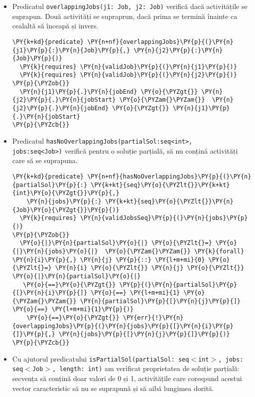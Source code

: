 \begin{itemize}
    \item 
    Predicatul \texttt{overlappingJobs(j1: Job, j2: Job)} verifică dacă activitățile se suprapun. Două activități se supraprun, dacă prima se termină înainte ca cealaltă să înceapă și invers. \begin{Verbatim}[commandchars=\\\{\}, fontsize=\footnotesize]
\PY{k+kd}{predicate} \PY{n+nf}{overlappingJobs}\PY{p}{(}\PY{n}{j1}\PY{p}{:}\PY{n}{Job}\PY{p}{,} \PY{n}{j2}\PY{p}{:}\PY{n}{Job}\PY{p}{)}
  \PY{k}{requires} \PY{n}{validJob}\PY{p}{(}\PY{n}{j1}\PY{p}{)}
  \PY{k}{requires} \PY{n}{validJob}\PY{p}{(}\PY{n}{j2}\PY{p}{)}
\PY{p}{\PYZob{}}
  \PY{n}{j1}\PY{p}{.}\PY{n}{jobEnd} \PY{o}{\PYZgt{}} \PY{n}{j2}\PY{p}{.}\PY{n}{jobStart} \PY{o}{\PYZam{}\PYZam{}}  \PY{n}{j2}\PY{p}{.}\PY{n}{jobEnd} \PY{o}{\PYZgt{}} \PY{n}{j1}\PY{p}{.}\PY{n}{jobStart} 
\PY{p}{\PYZcb{}}
\end{Verbatim}
    \item 
    Predicatul \texttt{hasNoOverlappingJobs(partialSol:seq<int>, \\jobs:seq<Job>)} verifică pentru o soluție parțială, să nu conțină activități care să se suprapuna.  
\begin{Verbatim}[commandchars=\\\{\}, fontsize=\footnotesize]
\PY{k+kd}{predicate} \PY{n+nf}{hasNoOverlappingJobs}\PY{p}{(}\PY{n}{partialSol}\PY{p}{:} \PY{k+kt}{seq}\PY{o}{\PYZlt{}}\PY{k+kt}{int}\PY{o}{\PYZgt{}}\PY{p}{,}
    \PY{n}{jobs}\PY{p}{:} \PY{k+kt}{seq}\PY{o}{\PYZlt{}}\PY{n}{Job}\PY{o}{\PYZgt{}}\PY{p}{)}
  \PY{k}{requires} \PY{n}{validJobsSeq}\PY{p}{(}\PY{n}{jobs}\PY{p}{)}
\PY{p}{\PYZob{}}
  \PY{o}{|}\PY{n}{partialSol}\PY{o}{|} \PY{o}{\PYZlt{}=} \PY{o}{|}\PY{n}{jobs}\PY{o}{|}  \PY{o}{\PYZam{}\PYZam{}} \PY{k}{forall} \PY{n}{i}\PY{p}{,} \PY{n}{j} \PY{p}{::} \PY{l+m+mi}{0} \PY{o}{\PYZlt{}=} \PY{n}{i} \PY{o}{\PYZlt{}} \PY{n}{j} \PY{o}{\PYZlt{}} \PY{o}{|}\PY{n}{partialSol}\PY{o}{|}
   \PY{o}{==}\PY{o}{\PYZgt{}} \PY{p}{(}\PY{n}{partialSol}\PY{p}{[}\PY{n}{i}\PY{p}{]} \PY{o}{==} \PY{l+m+mi}{1} \PY{o}{\PYZam{}\PYZam{}} \PY{n}{partialSol}\PY{p}{[}\PY{n}{j}\PY{p}{]} \PY{o}{==} \PY{l+m+mi}{1}\PY{p}{)}
    \PY{o}{==}\PY{o}{\PYZgt{}} \PY{err}{!}\PY{n}{overlappingJobs}\PY{p}{(}\PY{n}{jobs}\PY{p}{[}\PY{n}{i}\PY{p}{]}\PY{p}{,} \PY{n}{jobs}\PY{p}{[}\PY{n}{j}\PY{p}{]}\PY{p}{)}
\PY{p}{\PYZcb{}} 
\end{Verbatim}
    \item 
    Cu ajutorul predicatului \texttt{isPartialSol(partialSol: seq$<$int$>$, jobs: seq$<$Job$>$, length: int)} am verificat proprietatea de soluție parțială: secvența să conțină doar valori de 0 și 1, activitățile care corespund acestui vector caracteristic să nu se suprapună și să aibă lungimea dorită. 

\end{itemize}
